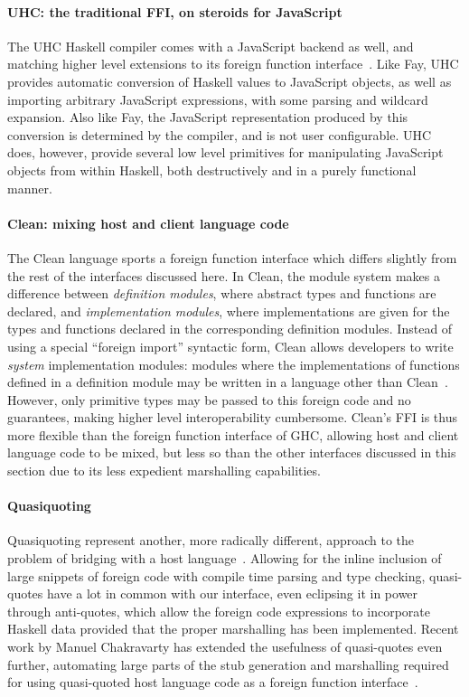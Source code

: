 \documentclass[preprint]{sigplanconf}
\begin{document}
\paragraph{UHC: the traditional FFI, on steroids for JavaScript}
The UHC Haskell compiler comes with a JavaScript backend as well, and matching
higher level extensions to its foreign function interface\ \cite{uhc}.
Like Fay, UHC provides automatic conversion of Haskell values to JavaScript
objects, as well as importing arbitrary JavaScript expressions, with some
parsing and wildcard expansion.
Also like Fay, the JavaScript representation produced by this
conversion is determined by the compiler, and is not user configurable.
UHC does, however, provide several low level primitives for manipulating
JavaScript objects from within Haskell, both destructively and in a purely
functional manner.

\paragraph{Clean: mixing host and client language code}
The Clean language sports a foreign function interface which differs slightly
from the rest of the interfaces discussed here. In Clean, the module system
makes a difference between \emph{definition modules}, where abstract types and
functions are declared, and \emph{implementation modules}, where implementations
are given for the types and functions declared in the corresponding definition
modules.
Instead of using a special ``foreign import'' syntactic form, Clean allows
developers to write \emph{system} implementation modules: modules where the
implementations of functions defined in a definition module may be written in
a language other than Clean\ \cite{clean}. However, only primitive types may
be passed to this foreign code and no guarantees, making higher level
interoperability cumbersome.
Clean's FFI is thus more flexible than the foreign function interface of GHC,
allowing host and client language code to be mixed, but less so than the other
interfaces discussed in this section due to its less expedient marshalling
capabilities.

\paragraph{Quasiquoting}
Quasiquoting represent another, more radically different, approach to the
problem of bridging with a host language\ \cite{quasiquotes}.
Allowing for the inline inclusion of large snippets of foreign code with
compile time parsing and type checking,
quasi-quotes have a lot in common with our interface, even eclipsing it in
power through anti-quotes, which allow the foreign code expressions to
incorporate Haskell data provided that the proper marshalling has been
implemented. Recent work by Manuel Chakravarty has extended the usefulness of
quasi-quotes even further, automating large parts of the stub generation
and marshalling required for using quasi-quoted host language code as a
foreign function interface\ \cite{language-c-inline}.
\end{document}

